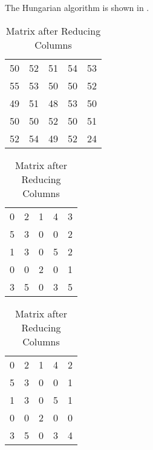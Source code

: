 \begin{subquestions}
\begin{subsubquestions}
The Hungarian algorithm is shown in .
\begin{table}[!h]
	\begin{minipage}{0.3\textwidth}
		\centering
		\begin{tabular}{ccccc}
			50 & 52 & 51 & 54 & 53 \\
		    55 & 53 & 50 & 50 & 52 \\
			49 & 51 & 48 & 53 & 50 \\
			50 & 50 & 52 & 50 & 51 \\
			52 & 54 & 49 & 52 & 24 \\
		\end{tabular}
		\captionsetup{width=1.1\linewidth}
		\caption*{Matrix From question}
	\end{minipage}
	\hspace{20pt}
	\begin{minipage}{0.3\textwidth}
		\centering
		\begin{tabular}{ccccc}
			0 & 2 & 1 & 4 & 3 \\
			5 & 3 & 0 & 0 & 2 \\
			1 & 3 & 0 & 5 & 2 \\
			0 & 0 & 2 & 0 & 1 \\
			3 & 5 & 0 & 3 & 5 \\
		\end{tabular}
		\captionsetup{width=1.1\linewidth}
		\caption*{Matrix after Reducing Rows}
	\end{minipage}
	\hspace{20pt}
	\begin{minipage}{0.3\textwidth}
		\centering
		\begin{tabular}{ccccc}
			0 & 2 & 1 & 4 & 2 \\
			5 & 3 & 0 & 0 & 1 \\
			1 & 3 & 0 & 5 & 1 \\
			0 & 0 & 2 & 0 & 0 \\
			3 & 5 & 0 & 3 & 4 \\
		\end{tabular}
		\captionsetup{width=1.1\linewidth}
		\caption*{Matrix after Reducing Columns} 
	\end{minipage}
	\vspace{20pt} 
	\begin{minipage}{0.3\textwidth}

\end{minipage}
\end{table}
\end{subsubquestions}
\end{subquestions}

